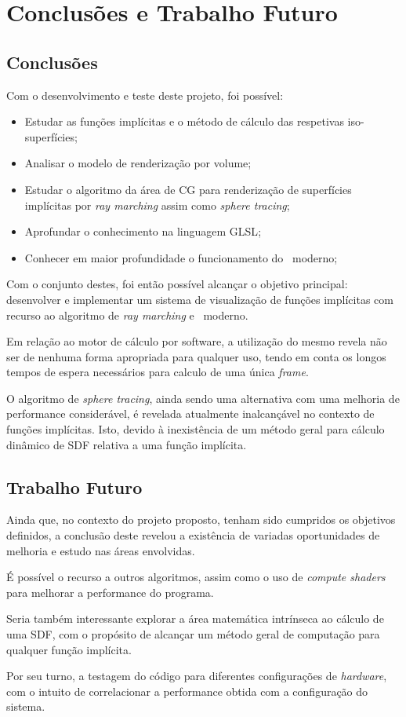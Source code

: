 \chapter{Conclusões e Trabalho Futuro}
\label{ch::conc}

\section{Conclusões}
\label{sec::conc:conc}

Com o desenvolvimento e teste deste projeto, foi possível:
\begin{itemize}
    \item Estudar as funções implícitas e o método de cálculo das respetivas iso-superfícies;
    \item Analisar o modelo de renderização por volume;
    \item Estudar o algoritmo da área de \ac{CG} para renderização de superfícies implícitas por \textit{ray marching} assim como \textit{sphere tracing};
    \item Aprofundar o conhecimento na linguagem \ac{GLSL};
    \item Conhecer em maior profundidade o funcionamento do \opengl~moderno;
\end{itemize}

Com o conjunto destes, foi então possível alcançar o objetivo principal: desenvolver e implementar um sistema de visualização de funções implícitas com recurso ao algoritmo de \textit{ray marching} e \opengl~moderno.

Em relação ao motor de cálculo por software, a utilização do mesmo revela não ser de nenhuma forma apropriada para qualquer uso, tendo em conta os longos tempos de espera necessários para calculo de uma única \textit{frame}.

O algoritmo de \textit{sphere tracing}, ainda sendo uma alternativa com uma melhoria de performance considerável, é revelada atualmente inalcançável no contexto de funções implícitas. Isto, devido à inexistência de um método geral para cálculo dinâmico de \ac{SDF} relativa a uma função implícita.


\section{Trabalho Futuro}
\label{sec::conc:futuro}

Ainda que, no contexto do projeto proposto, tenham sido cumpridos os objetivos definidos, a conclusão deste revelou a existência de variadas oportunidades de melhoria e estudo nas áreas envolvidas.

É possível o recurso a outros algoritmos, assim como o uso de \textit{compute shaders} para melhorar a performance do programa.

Seria também interessante explorar a área matemática intrínseca ao cálculo de uma \ac{SDF}, com o propósito de alcançar um método geral de computação para qualquer função implícita.

Por seu turno, a testagem do código para diferentes configurações de \textit{hardware}, com o intuito de correlacionar a performance obtida com a configuração do sistema.